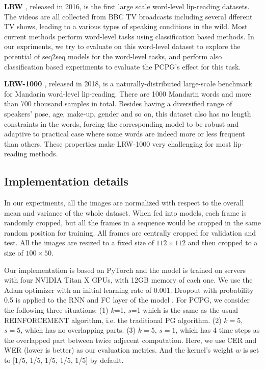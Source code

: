 \documentclass[a4paper, 10pt, conference]{ieeeconf}      %
\begin{document}
	{\bf LRW \cite{B2017}}, released in 2016, is the first large scale word-level lip-reading datasets. The videos are all collected from BBC TV broadcasts including several dfferent TV shows, leading to a various types of speaking conditions in the wild. Most current methods perform word-level tasks using classification based methods. In our expriments, we try to evaluate on this word-level dataset to explore the potential of seq2seq models for the word-level tasks, and perform also classification based experiments to evaluate the PCPG's effect for this task.
	
	{\bf LRW-1000 \cite{Yang2019}}, released in 2018, is a naturally-distributed large-scale benchmark for Mandarin word-level lip-reading. There are 1000 Mandarin words and more than 700 thousand samples in total. Besides having a diversified range of speakers' pose, age, make-up, gender and so on, this dataset also has no length constraints in the words, forcing the corresponding model to be robust and adaptive to practical case where some words are indeed more or less frequent than others. These properties make LRW-1000 very challenging for most lip-reading methods. %
	
	\subsection{Implementation details}
	In our experiments, all the images are normalized with respect to the overall mean and variance of the whole dataset. When fed into models, each frame is randomly cropped, but all the frames in a sequence would be cropped in the same random position for training. All frames are centrally cropped for validation and test. All the images are resized to a fixed size of $112\times112$ and then cropped to a size of $100\times50$. %
	
	Our implementation is based on PyTorch and the model is trained on servers with four NVIDIA Titan X GPUs, with 12GB memory of each one. We use the Adam optimizer with an initial learning rate of 0.001. Dropout with probability 0.5 is applied to the RNN and FC layer of the model . %
	For PCPG, we consider the following three situations: (1) $k$=1, $s$=1 which is the same as the usual REINFORCEMENT algorithm, i.e. the traditional PG algorithm. (2) $k=5$, $s=5$, which has no overlapping parts. (3) $k=5$, $s=1$, which has 4 time steps as the overlapped part between twice adjecent computation. Here, we use CER and WER (lower is better) as our evaluation metrics. And the kernel's weight $w$ is set to [1/5, 1/5, 1/5, 1/5, 1/5] by default.
	\vspace{0.2cm}
	
\end{document}
